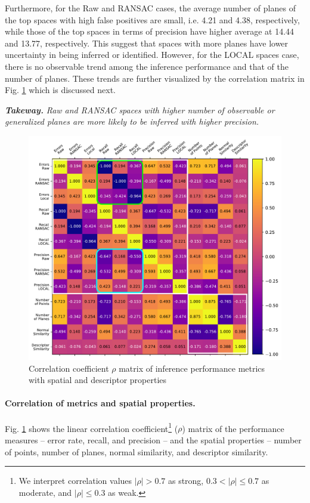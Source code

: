 Furthermore, for the Raw and RANSAC cases, the average number of planes of the top spaces with high false positives are small, i.e. 4.21 and 4.38, respectively, while those of the top spaces in terms of precision have higher average at 14.44 and 13.77, respectively. This suggest that spaces with more planes have lower uncertainty in being inferred or identified. However, for the LOCAL spaces case, there is no observable trend among the inference performance and that of the number of planes. These trends are further visualized by the correlation matrix in Fig. \ref{fig:space-analysis} which is discussed next.

\emph{\textbf{Takeway.}} \textit{Raw and RANSAC spaces with higher number of observable or generalized planes are more likely to be inferred with higher precision.}

\begin{figure}
	\centering
	\vspace{-2mm}
	\includegraphics[width=0.99\columnwidth]{figures/plots/space-analysis-corrcoef-more-rotations-all-edited}
	\vspace{-4mm}
	\caption{Correlation coefficient $\rho$ matrix of inference performance metrics with spatial and descriptor properties}
	\vspace{-2mm}
	\label{fig:space-analysis}
\end{figure}

\paragraph{Correlation of metrics and spatial properties.} Fig. \ref{fig:space-analysis} shows the linear correlation coefficient\footnote{We interpret correlation values $|\rho| > 0.7$ as strong, $0.3 <|\rho| \leq 0.7$ as moderate, and $|\rho| \leq 0.3$ as weak.} ($\rho$) matrix of the performance measures -- error rate, recall, and precision -- and the spatial properties -- number of points, number of planes, normal similarity, and descriptor similarity.


